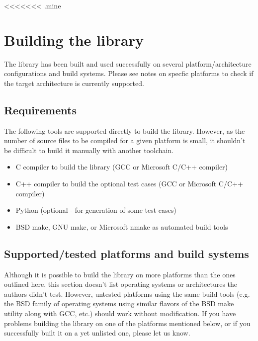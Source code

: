 <<<<<<< .mine
\newpage
\section{Building the library}

The library has been built and used successfully on several 
platform/architecture configurations and build systems.
Please see notes on specfic platforms to check if the target
architecture is currently supported.


\subsection{Requirements}

The following tools are supported directly to build the  library.
However, as the number of source files to be compiled for a given
platform is small, it shouldn't be difficult to build it manually with
another toolchain.
\begin{itemize}
\item C compiler to build the  library (GCC or Microsoft C/C++ compiler)
\item C++ compiler to build the optional test cases (GCC or Microsoft C/C++ compiler)
\item Python (optional - for generation of some test cases)
\item BSD make, GNU make, or Microsoft nmake as automated build tools
\end{itemize}


\subsection{Supported/tested platforms and build systems}

Although it is possible to build the  library on more platforms
than the ones outlined here, this section doesn't list operating systems or
architectures the authors didn't test. However, untested platforms using
the same build tools (e.g. the BSD family of operating systems using similar
flavors of the BSD make utility along with GCC, etc.) should work without
modification. If you have problems building the  library on one of the
platforms mentioned below, or if you successfully built it on a yet unlisted
one, please let us know.\\
\\

